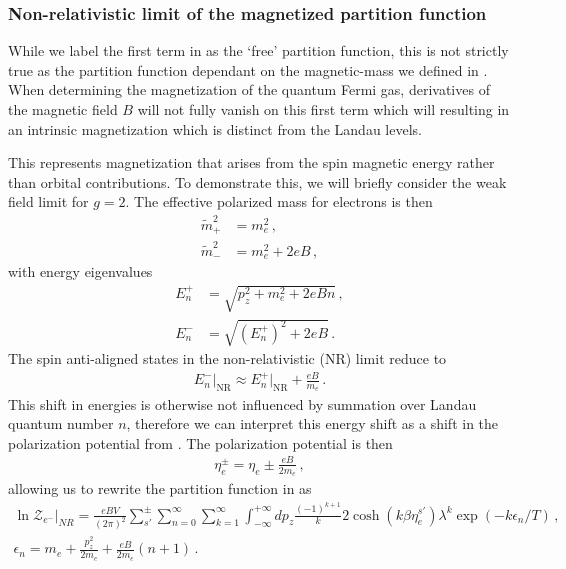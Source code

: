 \subsubsection{Non-relativistic limit of the magnetized partition function}
\label{sec:nrboltz}
While we label the first term in  as the `free' partition function, this is not strictly true as the partition function dependant on the magnetic-mass we defined in . When determining the magnetization of the quantum Fermi gas, derivatives of the magnetic field $B$ will not fully vanish on this first term which will resulting in an intrinsic magnetization which is distinct from the Landau levels.

This represents magnetization that arises from the spin magnetic energy rather than orbital contributions. To demonstrate this, we will briefly consider the weak field limit for $g=2$. The effective polarized mass for electrons is then
\begin{align}
  \label{MagMassPlus}
  \tilde{m}_{+}^{2}&=m_{e}^{2}\,,\\
  \label{MagMassMinus}
  \tilde{m}_{-}^{2}&=m_{e}^{2}+2eB\,,
\end{align}
with energy eigenvalues
\begin{align}
  \label{EPlus}
  E_{n}^{+}&=\sqrt{p_{z}^{2}+m_{e}^{2}+2eBn}\,,\\
  \label{EMinus}
  E_{n}^{-}&=\sqrt{\left(E_{n}^{+}\right)^{2}+2eB}\,.
\end{align}
The spin anti-aligned states in the non-relativistic (NR) limit reduce to
\begin{align}
  \label{EMinusNR} E_{n}^{-}\vert_\mathrm{NR}\approx E_{n}^{+}\vert_\mathrm{NR}+\frac{eB}{m_{e}}\,.
\end{align}
This shift in energies is otherwise not influenced by summation over Landau quantum number $n$, therefore we can interpret this energy shift as a shift in the polarization potential from . The polarization potential is then
\begin{align}
  \label{SpinChem} \eta_{e}^{\pm}=\eta_{e}\pm\frac{eB}{2m_{e}}\,,
\end{align}
allowing us to rewrite the partition function in  as
\begin{gather}
  \label{PartTotalNR} \ln\mathcal{Z}_{e^{-}}\vert_{NR}=\frac{eBV}{(2\pi)^{2}}\sum_{s'}^{\pm}\sum_{n=0}^{\infty}\sum_{k=1}^{\infty}\int_{-\infty}^{+\infty}dp_{z}\frac{(-1)^{k+1}}{k}2\cosh(k\beta\eta_{e}^{s'})\lambda^{k}\exp(-k\epsilon_{n}/T)\,,\\
  \label{NREnergy} \epsilon_{n}=m_{e}+\frac{p_{z}^{2}}{2m_{e}}+\frac{eB}{2m_{e}}\left(n+1\right)\,.
\end{gather}

